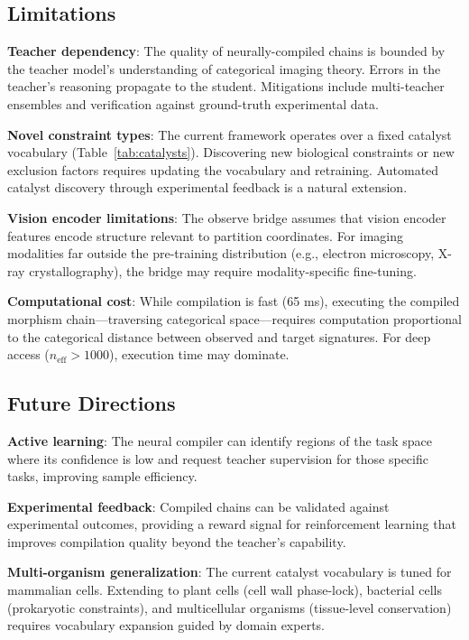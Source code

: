 \documentclass[11pt,a4paper]{article}
\theoremstyle{definition}
\theoremstyle{remark}
\begin{document}
\subsection{Limitations}

\textbf{Teacher dependency}: The quality of neurally-compiled chains is bounded by the teacher model's understanding of categorical imaging theory. Errors in the teacher's reasoning propagate to the student. Mitigations include multi-teacher ensembles and verification against ground-truth experimental data.

\textbf{Novel constraint types}: The current framework operates over a fixed catalyst vocabulary (Table~\ref{tab:catalysts}). Discovering new biological constraints or new exclusion factors requires updating the vocabulary and retraining. Automated catalyst discovery through experimental feedback is a natural extension.

\textbf{Vision encoder limitations}: The observe bridge assumes that vision encoder features encode structure relevant to partition coordinates. For imaging modalities far outside the pre-training distribution (e.g., electron microscopy, X-ray crystallography), the bridge may require modality-specific fine-tuning.

\textbf{Computational cost}: While compilation is fast (65 ms), executing the compiled morphism chain---traversing categorical space---requires computation proportional to the categorical distance between observed and target signatures. For deep access ($n_{\text{eff}} > 1000$), execution time may dominate.

\subsection{Future Directions}

\textbf{Active learning}: The neural compiler can identify regions of the task space where its confidence is low and request teacher supervision for those specific tasks, improving sample efficiency.

\textbf{Experimental feedback}: Compiled chains can be validated against experimental outcomes, providing a reward signal for reinforcement learning that improves compilation quality beyond the teacher's capability.

\textbf{Multi-organism generalization}: The current catalyst vocabulary is tuned for mammalian cells. Extending to plant cells (cell wall phase-lock), bacterial cells (prokaryotic constraints), and multicellular organisms (tissue-level conservation) requires vocabulary expansion guided by domain experts.
\end{document}
